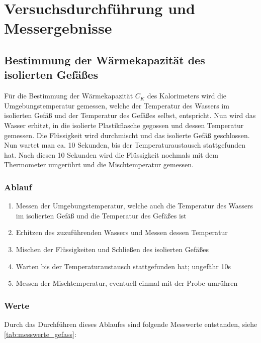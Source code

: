 \documentclass[11pt, ngerman]{scrartcl}
\begin{document}
\section{Versuchsdurchführung und Messergebnisse}
\label{sec:versuchsdurchfuehrung_messergebnisse}

\subsection{Bestimmung der Wärmekapazität des isolierten Gefäßes}
Für die Bestimmung der Wärmekapazität $C_K$ des Kalorimeters wird die
Umgebungstemperatur gemessen, welche der Temperatur des Wassers im isolierten
Gefäß und der Temperatur des Gefäßes selbst, entspricht. Nun wird das Wasser
erhitzt, in die isolierte Plastikflasche gegossen und dessen Temperatur gemessen.
Die Flüssigkeit wird durchmischt und das isolierte Gefäß geschlossen. Nun
wartet man ca. 10 Sekunden, bis der Temperaturaustausch stattgefunden hat. Nach
diesen 10 Sekunden wird die Flüssigkeit nochmals mit dem Thermometer umgerührt
und die Mischtemperatur gemessen.

\subsubsection{Ablauf}
\begin{enumerate}
	\item	Messen der Umgebungstemperatur, welche auch die Temperatur des Wassers im isolierten Gefäß und die Temperatur des Gefäßes ist
	\item	Erhitzen des zuzuführenden Wassers und Messen dessen Temperatur
	\item	Mischen der Flüssigkeiten und Schließen des isolierten Gefäßes
	\item	Warten bis der Temperaturaustausch stattgefunden hat; ungefähr 10s
	\item	Messen der Mischtemperatur, eventuell einmal mit der Probe umrühren
\end{enumerate}

\subsubsection{Werte}
Durch das Durchführen dieses Ablaufes sind folgende Messwerte entstanden, siehe
\autoref{tab:messwerte_gefass}:
\end{document}
